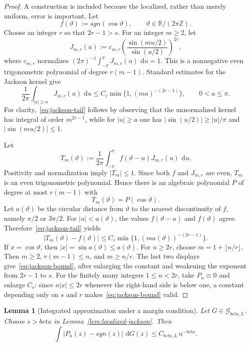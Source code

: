 \documentclass[11pt]{article}
\def\beta{beta}%
\def\sgn{sgn}%
\newtheorem{lemma}[theorem]{Lemma}
\newcommand{\R}{\mathbb R}
\newcommand{\sgn}{\operatorname{sgn}}
\newcommand{\calG}{\mathcal G}
\newcommand{\dd}{\,\mathrm d}
\begin{document}
\begin{proof}
A construction is included because the localized, rather than merely uniform, error is important.  Let
\[
f(\vartheta):=\sgn(\cos\vartheta),
\qquad \vartheta\in\R/(2\pi\mathbb Z).
\]
Choose an integer $r$ so that $2r-1>s$.  For an integer $m\ge2$, let
\[
J_{m,r}(u)
:=c_{m,r}
\left(\frac{\sin(mu/2)}{\sin(u/2)}\right)^{2r},
\]
where $c_{m,r}$ normalizes $(2\pi)^{-1}\int_{-\pi}^{\pi}J_{m,r}(u)\,\dd u=1$.  This is a nonnegative even trigonometric polynomial of degree $r(m-1)$.  Standard estimates for the Jackson kernel give
\begin{equation}
\label{eq:jackson-tail}
\frac1{2\pi}\int_{|u|\ge a}J_{m,r}(u)\,\dd u
\le
C_r\min\{1,(ma)^{-(2r-1)}\},
\qquad 0<a\le\pi.
\end{equation}
For clarity,~\eqref{eq:jackson-tail} follows by observing that the unnormalized kernel has integral of order $m^{2r-1}$, while for $|u|\ge a$ one has
$|\sin(u/2)|\ge |u|/\pi$ and $|\sin(mu/2)|\le1$.

Let
\[
T_m(\vartheta)
:=\frac1{2\pi}\int_{-\pi}^{\pi}f(\vartheta-u)J_{m,r}(u)\,\dd u.
\]
Positivity and normalization imply $|T_m|\le1$.  Since both $f$ and $J_{m,r}$ are even, $T_m$ is an even trigonometric polynomial.  Hence there is an algebraic polynomial $P$ of degree at most $r(m-1)$ with
\[
T_m(\vartheta)=P(\cos\vartheta).
\]
Let $a(\vartheta)$ be the circular distance from $\vartheta$ to the nearest discontinuity of $f$, namely $\pi/2$ or $3\pi/2$.  For $|u|<a(\vartheta)$, the values $f(\vartheta-u)$ and $f(\vartheta)$ agree.  Therefore~\eqref{eq:jackson-tail} yields
\[
|T_m(\vartheta)-f(\vartheta)|
\le
C_r\min\{1,(m a(\vartheta))^{-(2r-1)}\}.
\]
If $x=\cos\vartheta$, then $|x|=\sin a(\vartheta)\le a(\vartheta)$.  For $n\ge2r$, choose
$m=1+\lfloor n/r\rfloor$.  Then $m\ge2$, $r(m-1)\le n$, and $m\ge n/r$.  The last two displays give~\eqref{eq:jackson-bound}, after enlarging the constant and weakening the exponent from $2r-1$ to $s$.  For the finitely many integers $1\le n<2r$, take $P_n\equiv0$ and enlarge $C_s$: since $n|x|\le2r$ whenever the right-hand side is below one, a constant depending only on $s$ and $r$ makes~\eqref{eq:jackson-bound} valid.
\end{proof}

\begin{lemma}[Integrated approximation under a margin condition]
\label{lem:integrated-approx}
Let $G\in\calG_{\beta,L}$.  Choose $s>\beta$ in Lemma~\ref{lem:localized-jackson}.  Then
\begin{equation}
\label{eq:integrated-approx}
\int|P_n(z)-\sgn(z)|\,\dd G(z)
\le
C_{\beta,L}\,n^{-\beta}.
\end{equation}
\end{lemma}
\end{document}
